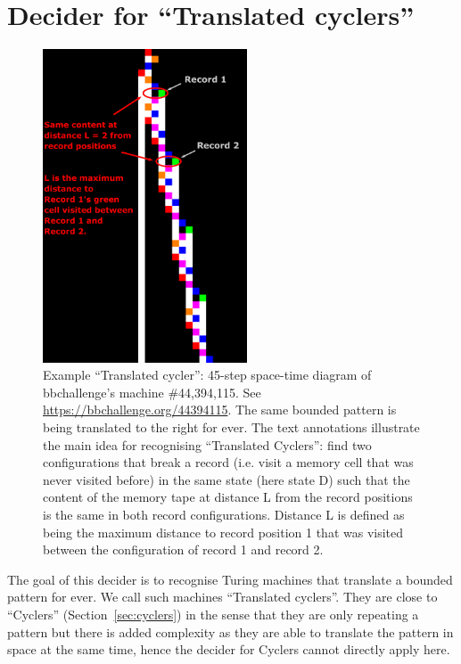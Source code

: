 \newpage
\section{Decider for ``Translated cyclers''}\label{sec:translated-cyclers}

\begin{figure}[h!]
  \centering
  \includegraphics[width=0.54\textwidth]{space-time-diagrams/translated_cycler_44394115_annotated.pdf}

  \caption{Example ``Translated cycler'': 45-step space-time diagram of bbchallenge's machine \#44,394,115. See \url{https://bbchallenge.org/44394115}. The same bounded pattern is being translated to the right for ever. The text annotations illustrate the main idea for recognising ``Translated Cyclers'': find two configurations that break a record (i.e. visit a memory cell that was never visited before) in the same state (here state \textcolor{colorD}{D}) such that the content of the memory tape at distance L from the record positions is the same in both record configurations. Distance L is defined as being the maximum distance to record position 1 that was visited between the configuration of record 1 and record 2.}\label{fig:translated-cyclers}
  \end{figure}
  
The goal of this decider is to recognise Turing machines that translate a bounded pattern for ever. We call such machines ``Translated cyclers''. They are close to ``Cyclers'' (Section~\ref{sec:cyclers}) in the sense that they are only repeating a pattern but there is added complexity as they are able to translate the pattern in space at the same time, hence the decider for Cyclers cannot directly apply here.

